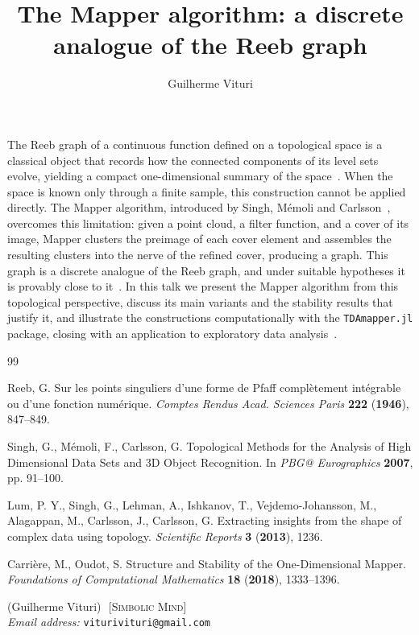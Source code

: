 \documentclass[10pt,a4paper]{amsart}
\begin{document}
\title{The Mapper algorithm: a discrete analogue of the Reeb graph}
\author{Guilherme Vituri}


\maketitle

The Reeb graph of a continuous function defined on a topological space is a
classical object that records how the connected components of its level sets
evolve, yielding a compact one-dimensional summary of the space~\cite{reeb1946}.
When the space is known only through a finite sample, this construction cannot
be applied directly. The Mapper algorithm, introduced by Singh, M\'emoli and
Carlsson~\cite{singh2007}, overcomes this limitation: given a point cloud, a
filter function, and a cover of its image, Mapper clusters the preimage of each
cover element and assembles the resulting clusters into the nerve of the refined
cover, producing a graph. This graph is a discrete analogue of the Reeb graph,
and under suitable hypotheses it is provably close to it~\cite{carriere2018}. In
this talk we present the Mapper algorithm from this topological perspective,
discuss its main variants and the stability results that justify it, and
illustrate the constructions computationally with the \texttt{TDAmapper.jl}
package, closing with an application to exploratory data
analysis~\cite{lum2013}.
\\

	\begin{thebibliography}{99}

		 Reeb, G. Sur les points singuliers d'une forme de
		Pfaff compl\`etement int\'egrable ou d'une fonction num\'erique.
		\emph{Comptes Rendus Acad. Sciences Paris}
		\textbf{222} (\textbf{1946}), 847--849.

		 Singh, G., M\'emoli, F., Carlsson, G. Topological
		Methods for the Analysis of High Dimensional Data Sets and 3D Object
		Recognition. In \emph{PBG@ Eurographics} \textbf{2007}, pp. 91--100.

		 Lum, P. Y., Singh, G., Lehman, A., Ishkanov, T.,
		Vejdemo-Johansson, M., Alagappan, M., Carlsson, J., Carlsson, G.
		Extracting insights from the shape of complex data using topology.
		\emph{Scientific Reports} \textbf{3} (\textbf{2013}), 1236.

		 Carri\`ere, M., Oudot, S. Structure and
		Stability of the One-Dimensional Mapper. \emph{Foundations of
		Computational Mathematics} \textbf{18} (\textbf{2018}), 1333--1396.

	\end{thebibliography}

	\bigskip
	\begin{flushleft}
		(Guilherme Vituri)\,\, \textsc{[Simbolic Mind]}\\
		\emph{Email address:}  \texttt{viturivituri@gmail.com}
	\end{flushleft}
\end{document}
